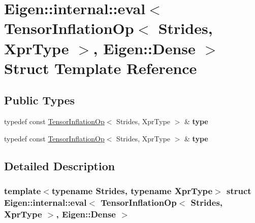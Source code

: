 \hypertarget{struct_eigen_1_1internal_1_1eval_3_01_tensor_inflation_op_3_01_strides_00_01_xpr_type_01_4_00_01_eigen_1_1_dense_01_4}{}\section{Eigen\+:\+:internal\+:\+:eval$<$ Tensor\+Inflation\+Op$<$ Strides, Xpr\+Type $>$, Eigen\+:\+:Dense $>$ Struct Template Reference}
\label{struct_eigen_1_1internal_1_1eval_3_01_tensor_inflation_op_3_01_strides_00_01_xpr_type_01_4_00_01_eigen_1_1_dense_01_4}
\subsection*{Public Types}
\begin{DoxyCompactItemize}
\item 
\mbox{\label{struct_eigen_1_1internal_1_1eval_3_01_tensor_inflation_op_3_01_strides_00_01_xpr_type_01_4_00_01_eigen_1_1_dense_01_4_a86d46b379173339a829828117969a45d}} 
typedef const \hyperlink{class_eigen_1_1_tensor_inflation_op}{Tensor\+Inflation\+Op}$<$ Strides, Xpr\+Type $>$ \& {\bfseries type}
\item 
\mbox{\label{struct_eigen_1_1internal_1_1eval_3_01_tensor_inflation_op_3_01_strides_00_01_xpr_type_01_4_00_01_eigen_1_1_dense_01_4_a86d46b379173339a829828117969a45d}} 
typedef const \hyperlink{class_eigen_1_1_tensor_inflation_op}{Tensor\+Inflation\+Op}$<$ Strides, Xpr\+Type $>$ \& {\bfseries type}
\end{DoxyCompactItemize}


\subsection{Detailed Description}
\subsubsection*{template$<$typename Strides, typename Xpr\+Type$>$\newline
struct Eigen\+::internal\+::eval$<$ Tensor\+Inflation\+Op$<$ Strides, Xpr\+Type $>$, Eigen\+::\+Dense $>$}



